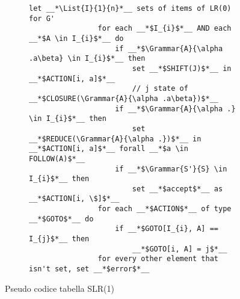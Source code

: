 \documentclass{subfiles}
\begin{document}
\begin{figure}[h!]
    \centering
    \begin{subfigure}[b]{0.625\textwidth}
        \begin{lstlisting}[language = PSEUDO]
                let __*\List{I}{1}{n}*__ sets of items of LR(0) for G'
                for each __*$I_{i}$*__ AND each __*$A \in I_{i}$*__ do
                    if __*$\Grammar{A}{\alpha .a\beta} \in I_{i}$*__ then 
                        set __*$SHIFT(J)$*__ in __*$ACTION[i, a]$*__
                        // j state of __*$CLOSURE(\Grammar{A}{\alpha .a\beta})$*__
                    if __*$\Grammar{A}{\alpha .} \in I_{i}$*__ then 
                        set __*$REDUCE(\Grammar{A}{\alpha .})$*__ in __*$ACTION[i, a]$*__ forall __*$a \in FOLLOW(A)$*__
                    if __*$\Grammar{S'}{S} \in I_{i}$*__ then
                        set __*$accept$*__ as __*$ACTION[i, \$]$*__
                for each __*$ACTION$*__ of type __*$GOTO$*__ do
                    if __*$GOTO[I_{i}, A] == I_{j}$*__ then
                        __*$GOTO[i, A] = j$*__
                for every other element that isn't set, set __*$error$*__
            \end{lstlisting}
    \end{subfigure}
    \caption{Pseudo codice tabella SLR(1)}
    \label{fig:9}
\end{figure}
\end{document}
